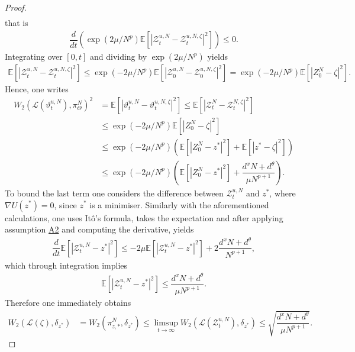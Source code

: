 \documentclass[a4paper, 10pt]{article}
\theoremstyle{plain}%
\begin{document}
\begin{proof}
\begin{align*}
    \end{align*}
    that is
    \begin{align*}
    \dfrac{d}{dt}\left(\exp(2\mu/N^p)\mathbb{E}\left[|\mathcal{Z}_t^{u,N}-\mathcal{Z}_t^{u,N,\zeta}|^2\right]\right)\leq 0.    
    \end{align*}
    Integrating over $[0,t]$ and dividing by $\exp(2\mu/N^p)$ yields
    \begin{align*}
    \mathbb{E}\left[|\mathcal{Z}_t^{u,N}-\mathcal{Z}_t^{u,N,\zeta}|^2\right]\leq \exp(-2\mu/N^p)\mathbb{E}\left[|\mathcal{Z}_0^{u,N}-\mathcal{Z}_0^{u,N,\zeta}|^2\right]= \exp(-2\mu/N^p)\mathbb{E}\left[|Z_0^N-\zeta|^2\right].
    \end{align*}
    Hence, one writes
    \begin{align*}
        W_2\left(\mathcal{L}(\vartheta_t^{u,N}),\pi_{\Theta}^N\right)^2&=\mathbb{E}\left[|\vartheta_t^{u,N}-\vartheta_t^{u,N,\zeta}|^2\right]\leq\mathbb{E}\left[|\mathcal{Z}_t^N-\mathcal{Z}_t^{N,\zeta}|^2\right]\\&\leq\exp(-2\mu/N^p)\mathbb{E}\left[|Z_0^N-\zeta|^2\right]\\
        &\leq\exp(-2\mu/N^p)\left(\mathbb{E}\left[|Z_0^N-z^*|^2\right]+\mathbb{E}\left[|z^*-\zeta|^2\right]\right)\\
        &\leq\exp(-2\mu/N^p)\left(\mathbb{E}\left[|Z_0^N-z^*|^2\right]+\dfrac{d^x N+d^{\theta}}{\mu N^{p+1}}\right).
    \end{align*}
    To bound the last term one considers the difference between $\mathcal{Z}_t^{u,N}$ and $z^*$, where $\nabla U(z^*)=0$, since $z^*$ is a minimiser. Similarly with the aforementioned calculations, one uses It\^o's formula, takes the expectation and after applying assumption \hyperlink{Assum2}{A2} and computing the derivative, yields
    \begin{align*}
        \dfrac{d}{dt}\mathbb{E}\left[|\mathcal{Z}_t^{u,N}-z^*|^2\right]\leq -2\mu\mathbb{E}\left[|\mathcal{Z}_t^{u,N}-z^*|^2\right]+2\dfrac{d^x N+d^{\theta}}{ N^{p+1}},
    \end{align*}
    which through integration implies
    \begin{align*}
     \mathbb{E}\left[|\mathcal{Z}_t^{u,N}-z^*|^2\right]\leq\dfrac{d^x N+d^{\theta}}{\mu N^{p+1}}.
    \end{align*}
    Therefore one immediately obtains
    \begin{align*}
    W_2(\mathcal{L}(\zeta),\delta_{z^*})&=W_2(\pi^N_{z,*},\delta_{z^*})\leq \limsup_{t\to\infty}W_2(\mathcal{L}(\mathcal{Z}_t^{u,N}),\delta_{z^*})\leq \sqrt{\dfrac{d^x N+d^{\theta}}{\mu N^{p+1}}}.
    \end{align*}
\end{proof}
\end{document}
